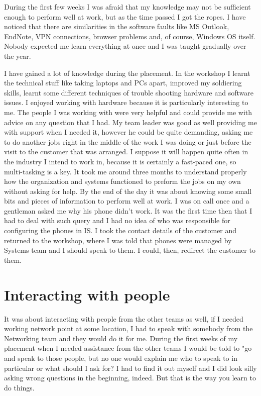 \documentclass[10pt,a4paper,headinclude=true,twoside]{report}
\begin{document}
During the first few weeks I was afraid that my knowledge may not be sufficient enough to perform well at work, but as the time passed I got the ropes. I have noticed that there are similarities in the software faults like MS Outlook, EndNote, VPN connections, browser problems and, of course, Windows OS itself. Nobody expected me learn everything at once and I was taught gradually over the year.

I have gained a lot of knowledge during the placement. In the workshop I learnt the technical stuff like taking laptops and PCs apart, improved my soldiering skills, learnt some different techniques of trouble shooting hardware and software issues. I enjoyed working with hardware because it is particularly interesting to me. The people I was working with were very helpful and could provide me with advice on any question that I had. My team leader was good as well providing me with support when I needed it, however he could be quite demanding, asking me to do another jobs right in the middle of the work I was doing or just before the visit to the customer that was arranged. I suppose it will happen quite often in the industry I intend to work in, because it is certainly a fast-paced one, so multi-tasking is a key. It took me around three months to understand properly how the organization and systems functioned to preform the jobs on my own without asking for help. By the end of the day it was about knowing some small bits and pieces of information to perform well at work. I was on call once and a gentleman asked me why his phone didn't work. It was the first time then that I had to deal with such query and I had no idea of who was responsible for configuring the phones in IS. I took the contact details of the customer and returned to the workshop, where I was told that phones were managed by Systems team and I should speak to them. I could, then, redirect the customer to them.

\section{Interacting with people}
It was about interacting with people from the other teams as well, if I needed working network point at some location, I had to speak with somebody from the Networking team and they would do it for me. During the first weeks of my placement when I needed assistance from the other teams I would be told to "go and speak to those people, but no one would explain me who to speak to in particular or what should I ask for? I had to find it out myself and I did look silly asking wrong questions in the beginning, indeed. But that is the way you learn to do things.
\end{document}
